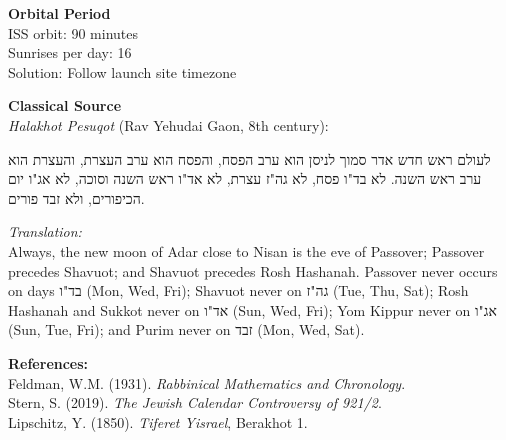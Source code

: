 \begin{technical}
\textbf{Orbital Period}\\[0.3em]
ISS orbit: 90 minutes\\
Sunrises per day: 16\\
Solution: Follow launch site timezone

\textbf{Classical Source}\\[0.3em]
\textit{Halakhot Pesuqot} (Rav Yehudai Gaon, 8th century):

\begin{hebrew}
לעולם ראש חדש אדר סמוך לניסן הוא ערב הפסח,
והפסח הוא ערב העצרת,
והעצרת הוא ערב ראש השנה.
לא בד"ו פסח,
לא גה"ז עצרת,
לא אד"ו ראש השנה וסוכה,
לא אג"ו יום הכיפורים,
ולא זבד פורים.
\end{hebrew}

\textit{Translation:}\\
Always, the new moon of Adar close to Nisan is the eve of Passover; Passover precedes Shavuot; and Shavuot precedes Rosh Hashanah. Passover never occurs on days \texthebrew{בד"ו} (Mon, Wed, Fri); Shavuot never on \texthebrew{גה"ז} (Tue, Thu, Sat); Rosh Hashanah and Sukkot never on \texthebrew{אד"ו} (Sun, Wed, Fri); Yom Kippur never on \texthebrew{אג"ו} (Sun, Tue, Fri); and Purim never on \texthebrew{זבד} (Mon, Wed, Sat).

\vspace{0.25em}
\textbf{References:}\\
{\footnotesize
Feldman, W.M. (1931). \textit{Rabbinical Mathematics and Chronology}.\\
Stern, S. (2019). \textit{The Jewish Calendar Controversy of 921/2}.\\
Lipschitz, Y. (1850). \textit{Tiferet Yisrael}, Berakhot 1.
}
\end{technical}